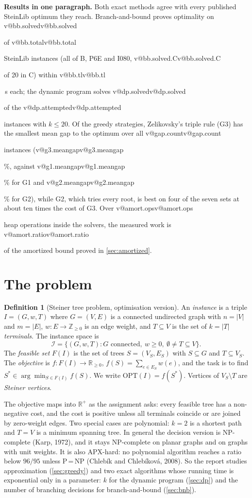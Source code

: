 \documentclass[11pt,a4paper]{article}
\makeatletter
\theoremstyle{plain}\newtheorem{theorem}{Theorem}[section]
\theoremstyle{definition}\newaliascnt{definition}{theorem}\newtheorem{definition}[definition]{Definition}\aliascntresetthe{definition}
\newcommand{\OPT}{\mathrm{OPT}}
\newcommand{\val}[1]{\ifcsname v@#1\endcsname\csname v@#1\endcsname\else\PackageError{report}{missing value #1}{}\fi}
\makeatother
\begin{document}
\begin{titlepage}
\vfill
\noindent\colorbox{soft}{\parbox{\dimexpr\linewidth-2\fboxsep}{\small
\textbf{Results in one paragraph.}
Both exact methods agree with every published SteinLib optimum they reach.
Branch-and-bound proves optimality on \val{bb.solved} of \val{bb.total} SteinLib instances
(all of B, P6E and I080, \val{bb.solved.C} of 20 in C) within \val{bb.tl}\,s each; the dynamic program solves
\val{dp.solved} of the \val{dp.attempted} instances with \(k\le 20\).
Of the greedy strategies, Zelikovsky's triple rule (G3) has the smallest mean gap to the optimum over all
\val{gap.count} instances (\val{g3.meangap}\%, against \val{g1.meangap}\% for G1 and \val{g2.meangap}\% for G2), while G2,
which tries every root, is best on four of the seven sets at about ten times the cost of G3.
Over \val{amort.ops} heap operations inside the solvers, the measured work is
\val{amort.ratio} of the amortized bound proved in \cref{sec:amortized}.
}}
\end{titlepage}

\tableofcontents
\newpage

\section{The problem}\label{sec:problem}

\begin{definition}[Steiner tree problem, optimisation version]
An \emph{instance} is a triple \(I=(G,w,T)\) where \(G=(V,E)\) is a connected undirected graph with
\(n=|V|\) and \(m=|E|\), \(w:E\to\mathbb{Z}_{\ge0}\) is an edge weight, and \(T\subseteq V\) is the set of
\(k=|T|\) \emph{terminals}. The instance space is
\[\mathcal I=\{(G,w,T): G \text{ connected},\ w\ge 0,\ \emptyset\neq T\subseteq V\}.\]
The \emph{feasible set} \(F(I)\) is the set of trees \(S=(V_S,E_S)\) with \(S\subseteq G\) and \(T\subseteq V_S\).
The \emph{objective} is \(f:F(I)\to\mathbb{R}_{\ge0}\), \(f(S)=\sum_{e\in E_S}w(e)\), and the task is to find
\(S^\ast\in\arg\min_{S\in F(I)}f(S)\). We write \(\OPT(I)=f(S^\ast)\). Vertices of \(V_S\setminus T\) are
\emph{Steiner vertices}.
\end{definition}

\noindent The objective maps into \(\mathbb{R}^+\) as the assignment asks: every feasible tree has a non-negative cost, and the cost is
positive unless all terminals coincide or are joined by zero-weight edges.
Two special cases are polynomial: \(k=2\) is a shortest path and \(T=V\) is a minimum spanning tree. In general the
decision version is NP-complete (Karp, 1972), and it stays NP-complete on planar graphs and on graphs with unit
weights. It is also APX-hard: no polynomial algorithm reaches a ratio below \(96/95\) unless P\,=\,NP
(Chleb\'ik and Chleb\'ikov\'a, 2008). So the report studies approximation (\cref{sec:greedy}) and two exact
algorithms whose running time is exponential only in a parameter: \(k\) for the dynamic program (\cref{sec:dp}) and
the number of branching decisions for branch-and-bound (\cref{sec:bnb}).
\end{document}
